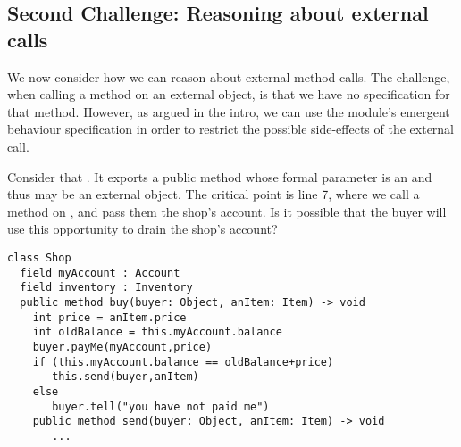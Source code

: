  \subsection{Second Challenge: Reasoning about external calls}
\label{sec:how}

{We now consider how we can reason about external method calls. 
The challenge, when calling a method on an external object, is that we have no specification for that method. 
However, as argued in the intro, we can use the module's emergent behaviour  specification   in order to restrict the possible side-effects of the external call.
}

 
 
Consider that  . It exports a public method  whose formal parameter  is an  and thus may be an external object. 
The critical point is line 7, where we call a method on , and pass them the shop's account.
Is it possible that the buyer will use this opportunity  to drain the shop's account?
 




%
 

\begin{lstlisting}
class Shop
  field myAccount : Account
  field inventory : Inventory    
  public method buy(buyer: Object, anItem: Item) -> void
    int price = anItem.price
    int oldBalance = this.myAccount.balance
    buyer.payMe(myAccount,price)
    if (this.myAccount.balance == oldBalance+price)
       this.send(buyer,anItem)
    else
       buyer.tell("you have not paid me") 
    public method send(buyer: Object, anItem: Item) -> void  
       ...            
\end{lstlisting}
 

